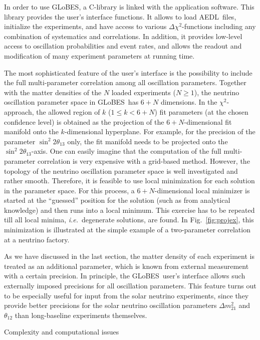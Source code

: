 \documentclass[12pt,a4paper]{article}
\makeatletter
\renewcommand{\section}{\@startsection{section}{1}{0em}{-\baselineskip}%
{\baselineskip}{\normalfont\large\bfseries}}
\newcommand{\ie}{{\it i.e.}}
\newcommand{\fig}{Fig.}
\newcommand{\sdm}{\Delta m_{21}^2}
\newcommand{\stheta}{\sin^2 2 \theta_{13}}
\newcommand{\GLOBES}{{\sf GLoBES}}
\newcommand{\AEDL}{{\sf AEDL}}
\newcommand{\figu}[1]{\fig~\ref{fig:#1}}
\makeatother
\begin{document}
In order to use \GLOBES , a C-library is linked with the application
software. This library provides the user's interface functions.
It allows to load \AEDL\ files, initialize the experiments, and
have access to various $\Delta \chi^2$-functions including any combination
of systematics and correlations. In addition, it provides low-level
access to oscillation probabilities and event rates, and allows
the readout and modification of many experiment parameters at running time.

The most sophisticated feature of the user's interface is the
possibility to include the full multi-parameter correlation among
all oscillation parameters. Together with the matter densities
of the $N$ loaded experiments ($N \ge 1$), the neutrino oscillation parameter space in \GLOBES\ has $6+N$ dimensions. In the $\chi^2$-approach,
the allowed region of $k$ ($1\le k<6+N$) fit parameters (at the chosen confidence level) is obtained as the projection of the $6+N$-dimensional fit manifold onto the $k$-dimensional hyperplane. For example,
for the precision of the parameter $\stheta$ only, the fit manifold
needs to be projected onto the $\stheta$-axis. One can easily imagine
that the computation of the full multi-parameter correlation is
very expensive with a grid-based method. However, the topology
of the neutrino oscillation parameter space is well investigated and
rather smooth. Therefore, it is feasible to use local minimization for each
solution in the parameter space.  For this process, 
a $6+N$-dimensional local minimizer
is started at the ``guessed'' position for the solution
(such as from analytical knowledge) and then runs into a
local minimum. This exercise has to be repeated till all local 
minima, \ie\ degenerate solutions, are found. In \figu{projex},
this minimization is illustrated at the simple example of a 
two-parameter correlation at a neutrino factory.

As we have discussed in the last section, the matter density of
each experiment is treated as an additional parameter, which is known
from external measurement with a certain precision. In principle, 
the \GLOBES\ user's interface allows such externally imposed
precisions for all oscillation parameters. This feature turns out
to be especially useful for input from the solar neutrino experiments,
since they provide better precisions for the solar neutrino
oscillation parameters $\sdm$ and $\theta_{12}$ than long-baseline
 experiments themselves.

\section{Complexity and computational issues}
\end{document}
